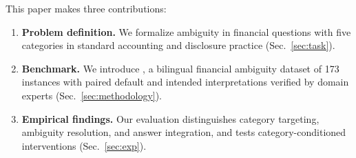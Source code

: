 This paper makes three contributions: \begin{enumerate}[leftmargin=*,itemsep=1pt]
  \item \textbf{Problem definition.} We formalize ambiguity in financial questions with five categories in standard accounting and disclosure practice (Sec.~\ref{sec:task}).
  \item \textbf{Benchmark.} We introduce \fininteract, a bilingual financial ambiguity dataset of 173 instances with paired default and intended interpretations verified by domain experts (Sec.~\ref{sec:methodology}).
  \item \textbf{Empirical findings.} Our evaluation distinguishes category targeting, ambiguity resolution, and answer integration, and tests category-conditioned interventions (Sec.~\ref{sec:exp}).
\end{enumerate}
